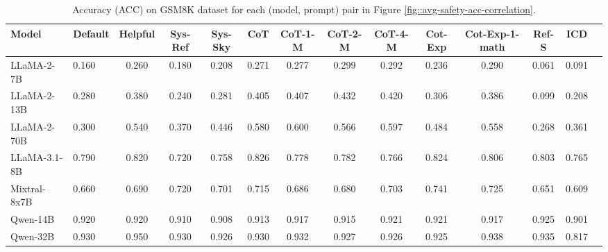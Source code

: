 \begin{table}[h]
\centering
\caption{Accuracy (ACC) on GSM8K dataset for each (model, prompt) pair in Figure \ref{fig::avg-safety-acc-correlation}.}
\label{tab::complete_prompting_results_acc}
\begin{adjustbox}{width=\textwidth}
\begin{tabular}{llcccccccccccc}
\toprule
Model & Default & Helpful & Sys-Ref & Sys-Sky & CoT & CoT-1-M & CoT-2-M & CoT-4-M & Cot-Exp & Cot-Exp-1-math & Ref-S & ICD \\
\midrule
LLaMA-2-7B & 0.160 & 0.260 & 0.180 & 0.208 & 0.271 & 0.277 & 0.299 & 0.292 & 0.236 & 0.290 & 0.061 & 0.091 \\
LLaMA-2-13B & 0.280 & 0.380 & 0.240 & 0.281 & 0.405 & 0.407 & 0.432 & 0.420 & 0.306 & 0.386 & 0.099 & 0.208 \\
LLaMA-2-70B & 0.300 & 0.540 & 0.370 & 0.446 & 0.580 & 0.600 & 0.566 & 0.597 & 0.484 & 0.558 & 0.268 & 0.361 \\
LLaMA-3.1-8B & 0.790 & 0.820 & 0.720 & 0.758 & 0.826 & 0.778 & 0.782 & 0.766 & 0.824 & 0.806 & 0.803 & 0.765 \\
Mixtral-8x7B & 0.660 & 0.690 & 0.720 & 0.701 & 0.715 & 0.686 & 0.680 & 0.703 & 0.741 & 0.725 & 0.651 & 0.609 \\
Qwen-14B & 0.920 & 0.920 & 0.910 & 0.908 & 0.913 & 0.917 & 0.915 & 0.921 & 0.921 & 0.917 & 0.925 & 0.901 \\
Qwen-32B & 0.930 & 0.950 & 0.930 & 0.926 & 0.930 & 0.932 & 0.927 & 0.926 & 0.925 & 0.938 & 0.935 & 0.817 \\
\bottomrule
\end{tabular}%
\end{adjustbox}
\end{table}




